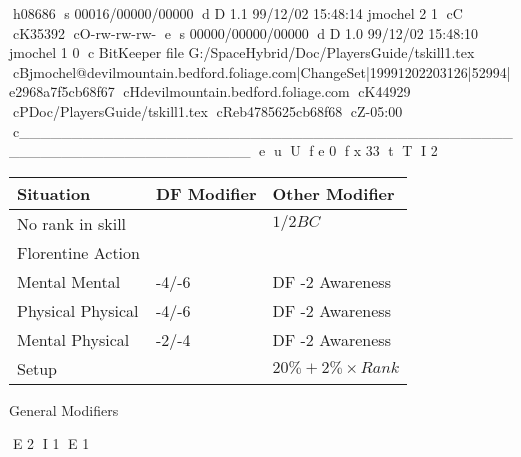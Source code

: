 h08686
s 00016/00000/00000
d D 1.1 99/12/02 15:48:14 jmochel 2 1
cC
cK35392
cO-rw-rw-rw-
e
s 00000/00000/00000
d D 1.0 99/12/02 15:48:10 jmochel 1 0
c BitKeeper file G:/SpaceHybrid/Doc/PlayersGuide/tskill1.tex
cBjmochel@devilmountain.bedford.foliage.com|ChangeSet|19991202203126|52994|e2968a7f5cb68f67
cHdevilmountain.bedford.foliage.com
cK44929
cPDoc/PlayersGuide/tskill1.tex
cReb4785625cb68f68
cZ-05:00
c______________________________________________________________________
e
u
U
f e 0
f x 33
t
T
I 2

\begin{SHTable}[h]
	\begin{tabular}{lll}
	Situation			& DF Modifier	& Other Modifier \\ 
	\hline
	No rank in skill 	& 				& \(1/2 BC \)	 \\
	Florentine Action	& 				& 					\\  \hline
	Mental Mental		& -4/-6			& DF -2 Awareness \\
	Physical Physical	& -4/-6			& DF -2 Awareness	\\
	Mental Physical		& -2/-4			& DF -2 Awareness	\\
	Setup				& 				& \( 20\% + 2\% \times Rank \) \\ 
    \end{tabular}
    \caption{General Modifiers}
\end{SHTable}
E 2
I 1
E 1
